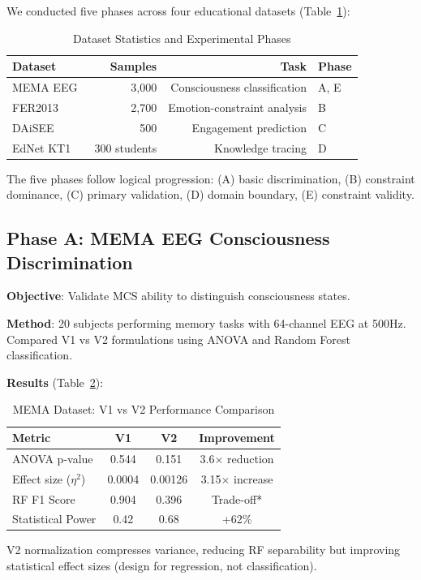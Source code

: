 \documentclass[10pt,journal,compsoc]{IEEEtran}
\begin{document}
We conducted five phases across four educational datasets (Table~\ref{tab:datasets}):

\begin{table}[!t]
\renewcommand{\arraystretch}{1.3}
\caption{Dataset Statistics and Experimental Phases}
\label{tab:datasets}
\centering
\small
\begin{tabular}{lrrp{1.2in}}
\toprule
\textbf{Dataset} & \textbf{Samples} & \textbf{Task} & \textbf{Phase} \\
\midrule
MEMA EEG~\cite{mema} & 3,000 & Consciousness classification & A, E \\
FER2013~\cite{fer2013} & 2,700 & Emotion-constraint analysis & B \\
DAiSEE~\cite{daisee} & 500 & Engagement prediction & C \\
EdNet KT1~\cite{ednet} & 300 students & Knowledge tracing & D \\
\bottomrule
\end{tabular}
\end{table}

The five phases follow logical progression: (A) basic discrimination, (B) constraint dominance, (C) primary validation, (D) domain boundary, (E) constraint validity.

\subsection{Phase A: MEMA EEG Consciousness Discrimination}

\textbf{Objective}: Validate MCS ability to distinguish consciousness states.

\textbf{Method}: 20 subjects performing memory tasks with 64-channel EEG at 500Hz. Compared V1 vs V2 formulations using ANOVA and Random Forest classification.

\textbf{Results} (Table~\ref{tab:mema_results}):

\begin{table}[!t]
\renewcommand{\arraystretch}{1.3}
\caption{MEMA Dataset: V1 vs V2 Performance Comparison}
\label{tab:mema_results}
\centering
\begin{tabular}{lccc}
\toprule
\textbf{Metric} & \textbf{V1} & \textbf{V2} & \textbf{Improvement} \\
\midrule
ANOVA p-value & 0.544 & 0.151 & 3.6$\times$ reduction \\
Effect size ($\eta^2$) & 0.0004 & 0.00126 & 3.15$\times$ increase \\
RF F1 Score & 0.904 & 0.396 & Trade-off* \\
Statistical Power & 0.42 & 0.68 & +62\% \\
\bottomrule
\end{tabular}
\begin{flushleft}
\small *V2 normalization compresses variance, reducing RF separability but improving statistical effect sizes (design for regression, not classification).
\end{flushleft}
\end{table}
\end{document}
